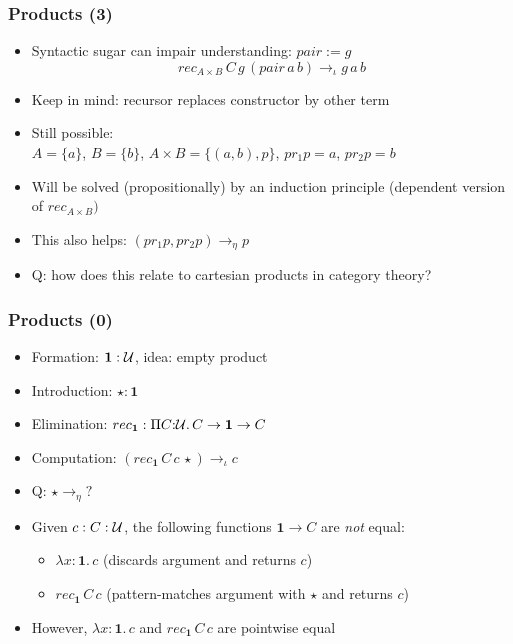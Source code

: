 \documentclass[handout]{beamer}
\newcommand{\depi}[3]{\Pi{#1{:}#2.\,#3}}
\newcommand{\lamt}[3]{\lambda{#1{:}#2.\,#3}}
\newcommand{\set}[1]{\{#1\}}
\newcommand{\UU}{{\cal U}}
\newcommand{\bfone}{\mathbf{1}}
\begin{document}
\frame
  {
  
    \frametitle{Products (3)}

    \begin{itemize}[<+->]
    \item Syntactic sugar can impair understanding: $pair := g$
    $$rec_{A{\times}B}\,C\,g\,(pair\,a\,b) \to_\iota g\,a\,b$$ 
    \item Keep in mind: recursor replaces constructor by other term  
    \item Still possible:\\
    $A=\set{a}$, $B=\set{b}$, $A{\times}B=\set{(a,b),p}$, $pr_1 p = a$, $pr_2 p = b$
    \item Will be solved (propositionally) by an induction principle 
          (dependent version of $rec_{A{\times}B})$
    \item This also helps: $(pr_1 p,pr_2 p)\to_\eta p$
    \item Q: how does this relate to cartesian products in category theory?
    \end{itemize}
  }

\frame
  {
  
    \frametitle{Products (0)}

    \begin{itemize}[<+->]
    \item Formation: $\bfone:\UU$, idea: empty product
    \item Introduction: $\star:\bfone$
    \item Elimination: $rec_{\bfone}:\depi{C}{\UU}{C\to\bfone\to C}$
    \item Computation: $(rec_{\bfone}\,{C}\,c\,\star) \to_\iota c$
    \item Q: $\star \to_\eta ?$
    \item Given $c:C:\UU$, the following functions $\bfone\to C$ are \emph{not} equal:
      \begin{itemize}[<+->]
      \item $\lamt{x}{\bfone}{c}$ (discards argument and returns $c$)
      \item $rec_{\bfone}\,{C}\,c$ (pattern-matches argument with $\star$ and returns $c$)
      \end{itemize}
    \item However, $\lamt{x}{\bfone}{c}$ and $rec_{\bfone}\,{C}\,c$ are pointwise equal
    \end{itemize}
  }
\end{document}
